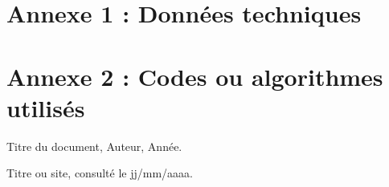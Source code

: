 \documentclass[12pt,a4paper]{article}
\begin{document}






\appendix


\section{Annexe 1 : Données techniques}


\section{Annexe 2 : Codes ou algorithmes utilisés}












\begin{thebibliography}{9}




Titre du document, Auteur, Année.








Titre ou site, consulté le jj/mm/aaaa.


\end{thebibliography}
\end{document}
